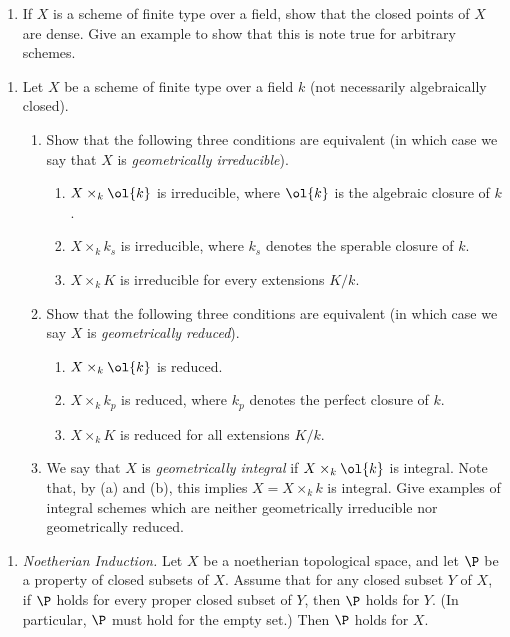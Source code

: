 \documentclass[12pt]{amsart}
\begin{document}
\begin{enumerate}
  \item[3.14.] {
      If $X$ is a scheme of finite type over a field, show that the closed points of $X$ are dense.
      Give an example to show that this is note true for arbitrary schemes.
    }
\end{enumerate}

\begin{enumerate}
  \item[3.15.] {
      Let $X$ be a scheme of finite type over a field $k$ (not necessarily algebraically closed).
      \begin{enumerate}
        \item Show that the following three conditions are equivalent (in which case we say that $X$ is \emph{geometrically irreducible}).
          \begin{enumerate}
            \item $X\times_k \ol{k}$ is irreducible, where $\ol{k}$ is the algebraic closure of $k$.
            \item $X\times_k k_s$ is irreducible, where $k_s$ denotes the sperable closure of $k$.
            \item $X\times_k K$ is irreducible for every extensions $K/k$.
          \end{enumerate}
        \item Show that the following three conditions are equivalent (in which case we say $X$ is \emph{geometrically reduced}).
          \begin{enumerate}
            \item $X\times_k \ol{k}$ is reduced.
            \item $X\times_k k_p$ is reduced, where $k_p$ denotes the perfect closure of $k$.
            \item $X\times_k K$ is reduced for all extensions $K/k$.
          \end{enumerate}
          \item We say that $X$ is \emph{geometrically integral} if $X\times_k \ol{k}$ is integral.
            Note that, by (a) and (b), this implies $X=X\times_k k$ is integral.
            Give examples of integral schemes which are neither geometrically irreducible nor geometrically reduced.
      \end{enumerate}
    }
\end{enumerate}

\begin{enumerate}
  \item[3.16.] {
      \emph{Noetherian Induction.}
      Let $X$ be a noetherian topological space, and let $\P$ be a property of closed subsets of $X$.
      Assume that for any closed subset $Y$ of $X$, if $\P$ holds for every proper closed subset of $Y$, then $\P$ holds for $Y$. 
      (In particular, $\P$ must hold for the empty set.)
      Then $\P$ holds for $X$.
    }
\end{enumerate}
\end{document}
